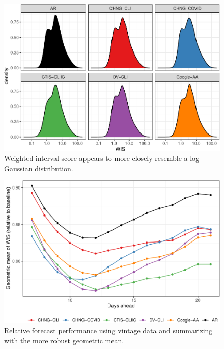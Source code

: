 \documentclass[9pt,twoside,lineno]{pnas-new}
\begin{document}
\clearpage

\begin{figure}

{\centering \includegraphics[width=\textwidth]{fig/wis-densities-1} 

}

\caption{Weighted interval score appears to more closely resemble a log-Gaussian distribution.}\label{fig:wis-densities}
\end{figure}

\clearpage

\begin{figure}

{\centering \includegraphics[width=\textwidth]{fig/fcast-adjusted-1} 

}

\caption{Relative forecast performance using vintage data and summarizing with the more robust geometric mean.}\label{fig:fcast-adjusted}
\end{figure}
\end{document}
